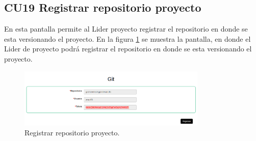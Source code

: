 \subsection{CU19 Registrar repositorio proyecto}
{
\justify
{}
}

\justify
En esta pantalla permite al Lider proyecto registrar el repositorio en donde se esta versionando el proyecto.
{
\justify
{}
}
\justify
En la figura \ref{fig:IU19} se muestra la pantalla, en donde el Lider de proyecto podrá registrar el repositorio en donde se esta versionando el proyecto.

\begin{figure}[htb]
\centering
\includegraphics[width=0.8\textwidth]{./images/cu19-registrar-repositorio-proyecto.png}
\caption{Registrar repositorio proyecto.} \label{fig:IU19}
\end{figure}
